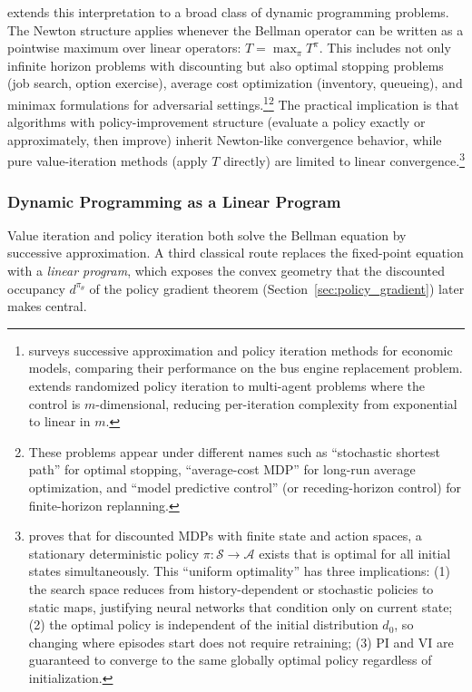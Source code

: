 \citet{bertsekas2022newton} extends this interpretation to a broad class of dynamic programming problems. The Newton structure applies whenever the Bellman operator can be written as a pointwise maximum over linear operators: $T = \max_\pi T^\pi$. This includes not only infinite horizon problems with discounting but also optimal stopping problems (job search, option exercise), average cost optimization (inventory, queueing), and minimax formulations for adversarial settings.\footnote{\citet{rust1996numerical} surveys successive approximation and policy iteration methods for economic models, comparing their performance on the bus engine replacement problem. \citet{zhang2023distributed} extends randomized policy iteration to multi-agent problems where the control is $m$-dimensional, reducing per-iteration complexity from exponential to linear in $m$.}\footnote{These problems appear under different names such as ``stochastic shortest path'' for optimal stopping, ``average-cost MDP'' for long-run average optimization, and ``model predictive control'' (or receding-horizon control) for finite-horizon replanning.} The practical implication is that algorithms with policy-improvement structure (evaluate a policy exactly or approximately, then improve) inherit Newton-like convergence behavior, while pure value-iteration methods (apply $T$ directly) are limited to linear convergence.\footnote{\citet{blackwell1965} proves that for discounted MDPs with finite state and action spaces, a stationary deterministic policy $\pi: \mathcal{S} \to \mathcal{A}$ exists that is optimal for all initial states simultaneously. This ``uniform optimality'' has three implications: (1) the search space reduces from history-dependent or stochastic policies to static maps, justifying neural networks that condition only on current state; (2) the optimal policy is independent of the initial distribution $d_0$, so changing where episodes start does not require retraining; (3) PI and VI are guaranteed to converge to the same globally optimal policy regardless of initialization.}

\subsubsection{Dynamic Programming as a Linear Program}
\label{sec:dp_as_lp}

Value iteration and policy iteration both solve the Bellman equation by successive approximation. A third classical route replaces the fixed-point equation with a \emph{linear program}, which exposes the convex geometry that the discounted occupancy $d^{\pi_\theta}$ of the policy gradient theorem (Section~\ref{sec:policy_gradient}) later makes central.

